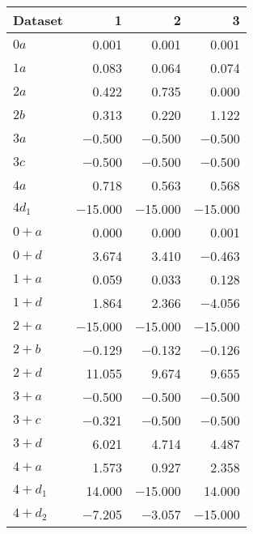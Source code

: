 \begin{tabular}{lrrr}
\toprule
 Dataset   &       1 &       2 &       3 \\
\midrule
 $0 a$     &   \num{0.001} &   \num{0.001} &   \num{0.001} \\
 $1 a$     &   \num{0.083} &   \num{0.064} &   \num{0.074} \\
 $2 a$     &   \num{0.422} &   \num{0.735} &   \num{0.000} \\
 $2 b$     &   \num{0.313} &   \num{0.220} &   \num{1.122} \\
 $3 a$     &  \num{-0.500} &  \num{-0.500} &  \num{-0.500} \\
 $3 c$     &  \num{-0.500} &  \num{-0.500} &  \num{-0.500} \\
 $4 a$     &   \num{0.718} &   \num{0.563} &   \num{0.568} \\
 $4 d_1$   & \num{-15.000} & \num{-15.000} & \num{-15.000} \\
 $0+ a$    &   \num{0.000} &   \num{0.000} &   \num{0.001} \\
 $0+ d$    &   \num{3.674} &   \num{3.410} &  \num{-0.463} \\
 $1+ a$    &   \num{0.059} &   \num{0.033} &   \num{0.128} \\
 $1+ d$    &   \num{1.864} &   \num{2.366} &  \num{-4.056} \\
 $2+ a$    & \num{-15.000} & \num{-15.000} & \num{-15.000} \\
 $2+ b$    &  \num{-0.129} &  \num{-0.132} &  \num{-0.126} \\
 $2+ d$    &  \num{11.055} &   \num{9.674} &   \num{9.655} \\
 $3+ a$    &  \num{-0.500} &  \num{-0.500} &  \num{-0.500} \\
 $3+ c$    &  \num{-0.321} &  \num{-0.500} &  \num{-0.500} \\
 $3+ d$    &   \num{6.021} &   \num{4.714} &   \num{4.487} \\
 $4+ a$    &   \num{1.573} &   \num{0.927} &   \num{2.358} \\
 $4+ d_1$  &  \num{14.000} & \num{-15.000} &  \num{14.000} \\
 $4+ d_2$  &  \num{-7.205} &  \num{-3.057} & \num{-15.000} \\
\bottomrule
\end{tabular}